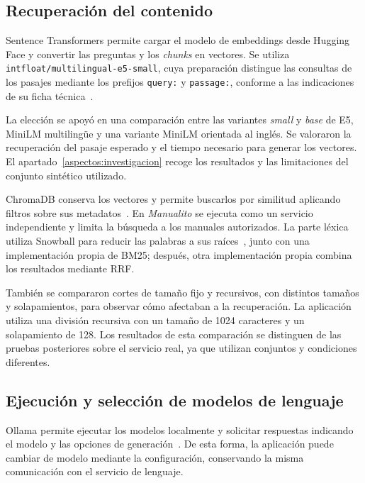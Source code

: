 \subsection{Recuperación del contenido}

Sentence Transformers permite cargar el modelo de embeddings desde
Hugging Face y convertir las preguntas y los \textit{chunks} en vectores. Se utiliza
\texttt{intfloat/multilingual-e5-small}, cuya preparación distingue las
consultas de los pasajes mediante los prefijos \texttt{query:} y
\texttt{passage:}, conforme a las indicaciones de su ficha
técnica~\cite{e5_small_model_card}.

La elección se apoyó en una comparación entre las variantes
\textit{small} y \textit{base} de E5, MiniLM multilingüe y una variante
MiniLM orientada al inglés. Se valoraron la recuperación del pasaje esperado
y el tiempo necesario para generar los vectores. El
apartado~\ref{aspectos:investigacion} recoge los resultados y las limitaciones
del conjunto sintético utilizado.

ChromaDB conserva los vectores y permite buscarlos por similitud aplicando
filtros sobre sus metadatos~\cite{chroma_introduccion}. En
\textit{Manualito} se ejecuta como un servicio independiente y limita la
búsqueda a los manuales autorizados. La parte léxica utiliza Snowball para
reducir las palabras a sus raíces~\cite{snowball_espanol}, junto con una
implementación propia de \acs{BM25}; después, otra implementación propia
combina los resultados mediante \acs{RRF}.

También se compararon cortes de tamaño fijo y recursivos, con distintos
tamaños y solapamientos, para observar cómo afectaban a la recuperación.
La aplicación utiliza una división recursiva con un tamaño de
1024 caracteres y un solapamiento de 128. Los resultados de esta comparación
se distinguen de las pruebas posteriores sobre el servicio real, ya que
utilizan conjuntos y condiciones diferentes.

\subsection{Ejecución y selección de modelos de lenguaje}

Ollama permite ejecutar los modelos localmente y solicitar respuestas
indicando el modelo y las opciones de
generación~\cite{ollama_generacion}. De esta forma, la aplicación puede
cambiar de modelo mediante la configuración, conservando la misma
comunicación con el servicio de lenguaje.

